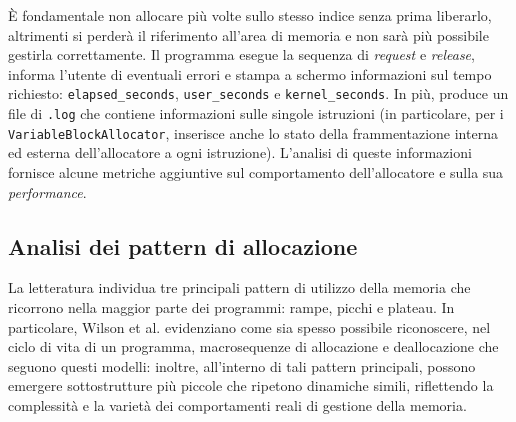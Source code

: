 È fondamentale non allocare più volte sullo stesso indice senza prima liberarlo, altrimenti si perderà il riferimento all'area di memoria e non sarà più possibile gestirla correttamente\footnotemark. Il programma esegue la sequenza di \textit{request} e \textit{release}, informa l'utente di eventuali errori e stampa a schermo informazioni sul tempo richiesto: \texttt{elapsed\_seconds}, \texttt{user\_seconds} e \texttt{kernel\_seconds}. In più, produce un file di \texttt{.log} che contiene informazioni sulle singole istruzioni (in particolare, per i \texttt{VariableBlockAllocator}, inserisce anche lo stato della frammentazione interna ed esterna dell'allocatore a ogni istruzione).
L'analisi di queste informazioni fornisce alcune metriche aggiuntive sul comportamento dell'allocatore e sulla sua \textit{performance}.


\subsection{Analisi dei pattern di allocazione}
La letteratura individua tre principali pattern di utilizzo della memoria che ricorrono nella maggior parte dei programmi: rampe, picchi e plateau\footnotemark. In particolare, Wilson et al. evidenziano come sia spesso possibile riconoscere, nel ciclo di vita di un programma, macrosequenze di allocazione e deallocazione che seguono questi modelli: inoltre, all'interno di tali pattern principali, possono emergere sottostrutture più piccole che ripetono dinamiche simili, riflettendo la complessità e la varietà dei comportamenti reali di gestione della memoria.


